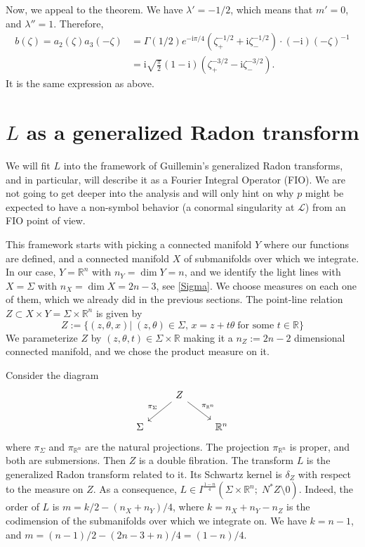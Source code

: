 \documentclass[11pt]{amsart}
\theoremstyle{definition}
\theoremstyle{remark}
\numberwithin{equation}{section}
\newcommand{\rb}{\mathbb{R}}
\newcommand{\I}{\mathrm{i}}
\begin{document}
Now, we appeal to the theorem. We have $\lambda' = -1/2$, which means that $m' = 0$, and $\lambda'' = 1$. Therefore,
	\begin{align*}
	b(\zeta)= 	a_{2}(\zeta) a_{3} (-\zeta) &= \Gamma(1/2) e^{-\I \pi/4} \left(\zeta_+^{-1/2} + \I \zeta_-^{-1/2} \right) \cdot (-\I) (-\zeta)^{-1}\\
		&= \I \sqrt{\frac{\pi}{2}} (1-\I)  ( \zeta_+^{-3/2} -\I \zeta_-^{-3/2}).
	\end{align*} 
It is the same expression as above. 

\section{$L$ as a generalized Radon transform} \label{sec_FIO}
We will fit $L$ into the framework of Guillemin's generalized Radon transforms, and in particular, will describe it as a Fourier Integral Operator (FIO). We are not going to get deeper into the analysis and will only hint on why $p$ might be expected to have a non-symbol behavior (a conormal singularity at $\mathcal{L}$) from an FIO point of view. 

This framework starts with picking a connected manifold $Y$ where our functions are defined, and a connected manifold $X$ of submanifolds over which we integrate.   In our case, $Y=\rb^n$ with $n_Y=\dim Y=n$, and we identify the light lines with  $X=\Sigma$ with $n_X= \dim X=2n-3$, see \eqref{Sigma}. We choose measures on each one of them, which we already did in the previous sections. The point-line relation $Z\subset X\times Y = \Sigma\times \rb^n$  is given by 
\begin{equation}
Z:= \{(z,\theta,x)|\; (z,\theta)\in \Sigma, \, x=z+t\theta\; \text{for some $t\in\rb$}\}
\end{equation}
We parameterize $Z$ by $(z,\theta,t)\in \Sigma\times \rb$ making it a $n_Z:= 2n-2$ dimensional connected manifold, and we chose the product measure on it. 

Consider the diagram
\begin{equation} \label{diag1}
	\begin{tikzcd}[]
		&  Z \arrow{dl}[swap]{\pi_{\Sigma}}\arrow{dr}{\pi_{\rb^n}} & \\
		\Sigma  
		& &\rb^n
	\end{tikzcd} 
\end{equation}
where $\pi_\Sigma$ and $\pi_{\rb^n}$ are the natural projections. The projection $\pi_{\rb^n}$ is proper, and both are submersions. Then $Z$ is a double fibration. The transform $L$ is the generalized Radon transform related to it. Its Schwartz kernel is $\delta_Z$ with respect to the measure on $Z$. As a consequence, $L\in I^\frac{1-n}4(\Sigma\times\rb^n; \; N^*Z\setminus 0)$. Indeed, the order of $L$ is  $m= k/2- (n_X+n_Y)/4$, where $k =n_X+n_Y-n_Z $ is the codimension of the submanifolds over which we integrate on. We have $k=n-1$, and $m= (n-1)/2 - (2n-3+n)/4= (1-n)/4$.
\end{document}
